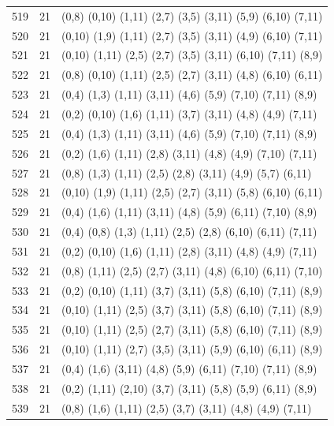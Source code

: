 \begin{appendix}
{\begin{longtable}{lll}
    519& 21 & (0,8)   (0,10)  (1,11)  (2,7)   (3,5)   (3,11)  (5,9)   (6,10)  (7,11)\\
    520& 21 & (0,10)  (1,9)   (1,11)  (2,7)   (3,5)   (3,11)  (4,9)   (6,10)  (7,11)\\
    521& 21 & (0,10)  (1,11)  (2,5)   (2,7)   (3,5)   (3,11)  (6,10)  (7,11)  (8,9)\\
    522& 21 & (0,8)   (0,10)  (1,11)  (2,5)   (2,7)   (3,11)  (4,8)   (6,10)  (6,11)\\
    523& 21 & (0,4)   (1,3)   (1,11)  (3,11)  (4,6)   (5,9)   (7,10)  (7,11)  (8,9)\\
    524& 21 & (0,2)   (0,10)  (1,6)   (1,11)  (3,7)   (3,11)  (4,8)   (4,9)   (7,11)\\
    525& 21 & (0,4)   (1,3)   (1,11)  (3,11)  (4,6)   (5,9)   (7,10)  (7,11)  (8,9)\\
    526& 21 & (0,2)   (1,6)   (1,11)  (2,8)   (3,11)  (4,8)   (4,9)   (7,10)  (7,11)\\
    527& 21 & (0,8)   (1,3)   (1,11)  (2,5)   (2,8)   (3,11)  (4,9)   (5,7)   (6,11)\\
    528& 21 & (0,10)  (1,9)   (1,11)  (2,5)   (2,7)   (3,11)  (5,8)   (6,10)  (6,11)\\
    529& 21 & (0,4)   (1,6)   (1,11)  (3,11)  (4,8)   (5,9)   (6,11)  (7,10)  (8,9)\\
    530& 21 & (0,4)   (0,8)   (1,3)   (1,11)  (2,5)   (2,8)   (6,10)  (6,11)  (7,11)\\
    531& 21 & (0,2)   (0,10)  (1,6)   (1,11)  (2,8)   (3,11)  (4,8)   (4,9)   (7,11)\\
    532& 21 & (0,8)   (1,11)  (2,5)   (2,7)   (3,11)  (4,8)   (6,10)  (6,11)  (7,10)\\
    533& 21 & (0,2)   (0,10)  (1,11)  (3,7)   (3,11)  (5,8)   (6,10)  (7,11)  (8,9)\\
    534& 21 & (0,10)  (1,11)  (2,5)   (3,7)   (3,11)  (5,8)   (6,10)  (7,11)  (8,9)\\
    535& 21 & (0,10)  (1,11)  (2,5)   (2,7)   (3,11)  (5,8)   (6,10)  (7,11)  (8,9)\\
    536& 21 & (0,10)  (1,11)  (2,7)   (3,5)   (3,11)  (5,9)   (6,10)  (6,11)  (8,9)\\
    537& 21 & (0,4)   (1,6)   (3,11)  (4,8)   (5,9)   (6,11)  (7,10)  (7,11)  (8,9)\\
    538& 21 & (0,2)   (1,11)  (2,10)  (3,7)   (3,11)  (5,8)   (5,9)   (6,11)  (8,9)\\
    539& 21 & (0,8)   (1,6)   (1,11)  (2,5)   (3,7)   (3,11)  (4,8)   (4,9)   (7,11)\\

\end{longtable}}
\end{appendix}

